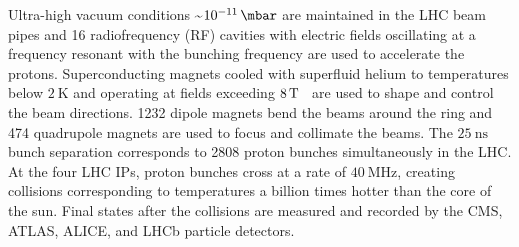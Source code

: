 Ultra-high vacuum conditions \sim$\SI{e-11}{\mbar}$ are maintained in the LHC beam pipes and 16 radiofrequency (RF) cavities with electric fields oscillating at a frequency resonant with the bunching frequency are used to accelerate the protons.
Superconducting magnets cooled with superfluid helium to temperatures below $\SI{2}{\K}$ and operating at fields exceeding $\SI{8}{\T}$~\cite{LyndonEvans_2008} are used to shape and control the beam directions.
1232 dipole magnets bend the beams around the ring and 474 quadrupole magnets are used to focus and collimate the beams.
The $\SI{25}{\ns}$ bunch separation corresponds to 2808 proton bunches simultaneously in the LHC.
At the four LHC IPs, proton bunches cross at a rate of $\SI{40}{\MHz}$, creating collisions corresponding to temperatures a billion times hotter than the core of the sun.
Final states after the collisions are measured and recorded by the CMS, ATLAS, ALICE, and LHCb particle detectors.

